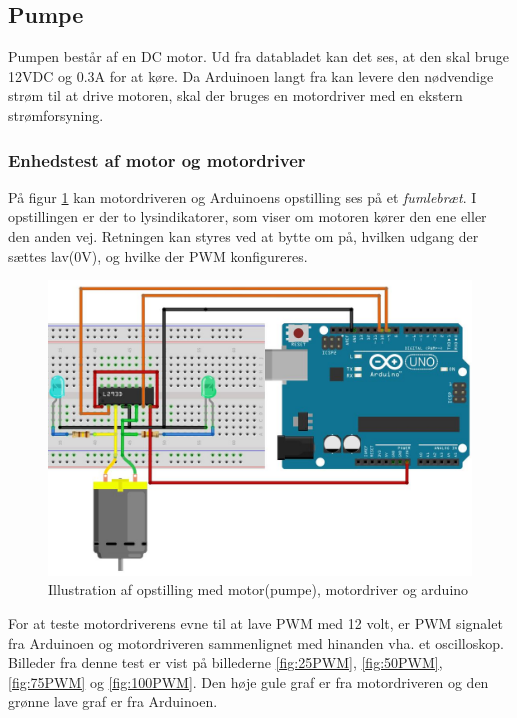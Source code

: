 \subsection{Pumpe}
 Pumpen består af en DC motor. Ud fra databladet kan det ses, at den skal bruge 12VDC og 0.3A for at køre. Da Arduinoen langt fra kan levere den nødvendige strøm til at drive motoren, skal der bruges en motordriver med en ekstern strømforsyning.
 

\subsubsection{Enhedstest af motor og motordriver}
\label{subsubsec:enhedstestmotor}
På figur \ref{fig:Motorbreadboard} kan motordriveren og Arduinoens opstilling ses på et \textit{fumlebræt}. I opstillingen er der to lysindikatorer, som viser om motoren kører den ene eller den anden vej. Retningen kan styres ved at bytte om på, hvilken udgang der sættes lav(0V), og hvilke der PWM konfigureres.
 

 \begin{figure}[H]
	\centering
	\includegraphics[width=1\textwidth]{billeder/Hardware/diagrammer/Motorbreadboard.JPG}
	\caption{Illustration af opstilling med motor(pumpe), motordriver og arduino}
	\label{fig:Motorbreadboard}
\end{figure}

For at teste motordriverens evne til at lave PWM med 12 volt, er PWM signalet fra Arduinoen og motordriveren sammenlignet med hinanden vha. et oscilloskop. Billeder fra denne test er vist på  billederne \ref{fig:25PWM}, \ref{fig:50PWM}, \ref{fig:75PWM} og \ref{fig:100PWM}. Den høje gule graf er fra motordriveren og den grønne lave graf er fra Arduinoen.

